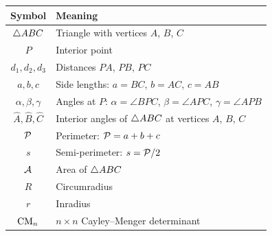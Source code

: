 \begin{center}
\begin{tabular}{cl}
\toprule
\textbf{Symbol} & \textbf{Meaning} \\
\midrule
$\triangle ABC$ & Triangle with vertices $A$, $B$, $C$ \\
$P$ & Interior point \\
$d_1, d_2, d_3$ & Distances $PA$, $PB$, $PC$ \\
$a, b, c$ & Side lengths: $a = BC$, $b = AC$, $c = AB$ \\
$\alpha, \beta, \gamma$ & Angles at $P$: $\alpha = \angle BPC$, $\beta = \angle APC$, $\gamma = \angle APB$ \\
$\hat{A}, \hat{B}, \hat{C}$ & Interior angles of $\triangle ABC$ at vertices $A$, $B$, $C$ \\
$\mathcal{P}$ & Perimeter: $\mathcal{P} = a + b + c$ \\
$s$ & Semi-perimeter: $s = \mathcal{P} / 2$ \\
$\mathcal{A}$ & Area of $\triangle ABC$ \\
$R$ & Circumradius \\
$r$ & Inradius \\
$\mathrm{CM}_n$ & $n \times n$ Cayley--Menger determinant \\
\bottomrule
\end{tabular}
\end{center}

